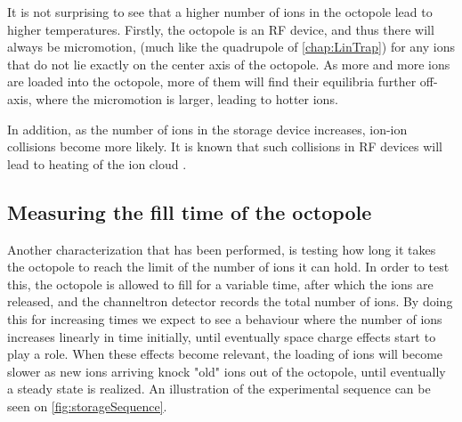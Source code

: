 It is not surprising to see that a higher number of ions in the octopole lead to higher temperatures. Firstly, the octopole is an RF device, and thus there will always be micromotion,
 (much like the quadrupole of \cref{chap:LinTrap}) for any ions that do not lie exactly on the center axis of the octopole. 
As more and more ions are loaded into the octopole, more of them will find their equilibria further off-axis, where the micromotion is larger, leading to hotter ions.

In addition, as the number of ions in the storage device increases, ion-ion collisions become more likely. It is known that such collisions in RF devices will lead to heating of the ion cloud \cite{BlumelHeating,MichaelIonIonHeating}.


\subsection{Measuring the fill time of the octopole}
Another characterization that has been performed, is testing how long it takes the octopole to reach the limit of the number of ions it can hold.
In order to test this, the octopole is allowed to fill for a variable time, after which the ions are released, and the channeltron detector records the total number of ions.
By doing this for increasing times we expect to see a behaviour where the number of ions increases linearly in time initially, until eventually space charge effects start to play a role.
When these effects become relevant, the loading of ions will become slower as new ions arriving knock "old" ions out of the octopole, until eventually a steady state is realized.
An illustration of the experimental sequence can be seen on \cref{fig:storageSequence}. 

